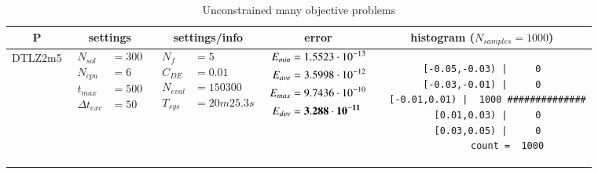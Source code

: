 
\begin{table*} [!t] \centering
\caption{Unconstrained many objective problems}
\scriptsize  \setlength{\tabcolsep}{0.5em}

\begin{tabular}[c]{ccccc} \toprule
P & settings & settings/info & error & histogram ($N_{samples}=1000$) \\ \hline

DTLZ2m5
&
{$\!\begin{aligned}
    N_{sol}        &= 300 \\
	N_{cpu}        &= 6 \\
	t_{max}        &= 500 \\
	\Delta t_{exc} &= 50
\end{aligned}$}
&
{$\!\begin{aligned}
	N_{f}    &= 5 \\
	C_{DE}   &= 0.01 \\
	N_{eval} &= 150300 \\
	T_{sys}  &= 20m25.3s
\end{aligned}$}
&
{$\!\begin{aligned}
    E_{min} &= 1.5523\cdot 10^{-13} \\
    E_{ave} &= 3.5998\cdot 10^{-12} \\
    E_{max} &= 9.7436\cdot 10^{-10} \\
    E_{dev} &= {\bf 3.288\cdot 10^{-11}}
\end{aligned}$}
&
\begin{minipage}{4.1cm} \fontsize{5pt}{6pt}
\begin{verbatim}
 [-0.05,-0.03) |     0 
 [-0.03,-0.01) |     0 
  [-0.01,0.01) |  1000 ##############
   [0.01,0.03) |     0 
   [0.03,0.05) |     0 
         count =  1000
 \end{verbatim}
\end{minipage} \\

\hline




\end{tabular}
\end{table*}
